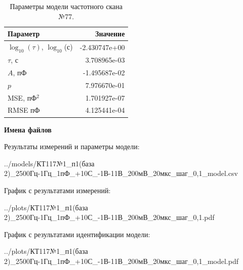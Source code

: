 \begin{table}[!ht]
    \centering
    \caption{Параметры модели частотного скана №77.}
    \begin{tabular}{|l|r|}
        \hline
        Параметр                                       & Значение                  \\ \hline
        $\log_{10}(\tau)$, $\log_{10}$(с)              & -2.430747e+00             \\ \hline
        $\tau$, с                                      & 3.708965e-03              \\ \hline
        $A$, пФ                                        & -1.495687e-02             \\ \hline
        $p$                                            & 7.976670e-01              \\ \hline
        MSE, пФ$^2$                                    & 1.701927e-07              \\ \hline
        RMSE пФ                                        & 4.125441e-04              \\ \hline
    \end{tabular}
    \label{table:frequency_scan_model_77}
\end{table}

\textbf{Имена файлов}

Результаты измерений и параметры модели:

\scriptsize../models/КТ117№1\_п1(база 2)\_2500Гц-1Гц\_1пФ\_+10С\_-1В-11В\_200мВ\_20мкс\_шаг\_0,1\_model.csv
\normalsize

График с результатами измерений:

\scriptsize../plots/КТ117№1\_п1(база 2)\_2500Гц-1Гц\_1пФ\_+10С\_-1В-11В\_200мВ\_20мкс\_шаг\_0,1.pdf
\normalsize

График с результатами идентификации модели:

\scriptsize../plots/КТ117№1\_п1(база 2)\_2500Гц-1Гц\_1пФ\_+10С\_-1В-11В\_200мВ\_20мкс\_шаг\_0,1\_model.pdf
\normalsize

